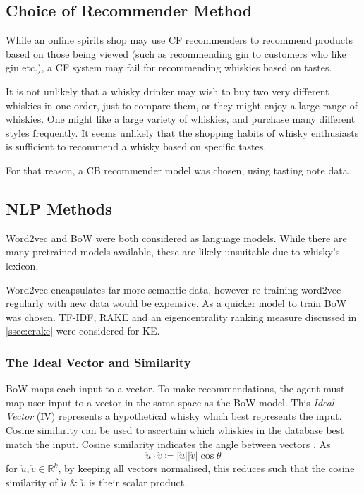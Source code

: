 \subsection{Choice of Recommender Method}
While an online spirits shop may use CF recommenders to recommend products based on those being viewed
(such as recommending gin to customers who like gin etc.), a CF system may fail for
recommending whiskies based on tastes.

It is not unlikely that a whisky drinker may wish to buy two very different whiskies in one order, just 
to compare them, or they might enjoy a large range of whiskies. One might like a large
variety of whiskies, and purchase many different styles frequently. 
It seems unlikely that the shopping habits of whisky enthusiasts is sufficient to recommend a whisky
based on specific tastes.

For that reason, a CB recommender model was chosen, using tasting note data.

\subsection{NLP Methods}\label{whiskylang}
Word2vec and BoW were both considered as language models. While there are
many pretrained models available, these are likely unsuitable due to whisky's lexicon.

Word2vec encapsulates far more semantic data, however re-training
word2vec regularly with new data would be expensive. As a quicker model to train
BoW was chosen.  TF-IDF, RAKE and an eigencentrality ranking measure discussed in 
\autoref{ssec:erake} were considered for KE.

\subsubsection{The Ideal Vector and Similarity}\label{sssec:cossim}
BoW maps each input to a vector. To make recommendations, the agent must
map user input to a vector in the same space as the BoW model. This
\emph{Ideal Vector} (IV) represents a hypothetical whisky which best represents 
the input. Cosine similarity can be used to ascertain which whiskies in 
the database best match the input.  Cosine similarity indicates the angle between
vectors \cite{Melville2010}. As  
\begin{equation}
    \utilde{u} \cdot \utilde{v} \coloneqq \vert \utilde{u} \vert \vert \utilde{v} \vert \cos{\theta}
\end{equation}
for $\utilde{u}, \utilde{v}\in \mathbb{R} ^{k}$, by keeping all vectors normalised, this reduces such
that the cosine similarity of $\utilde{u}$ \& $\utilde{v}$ is their scalar product.

